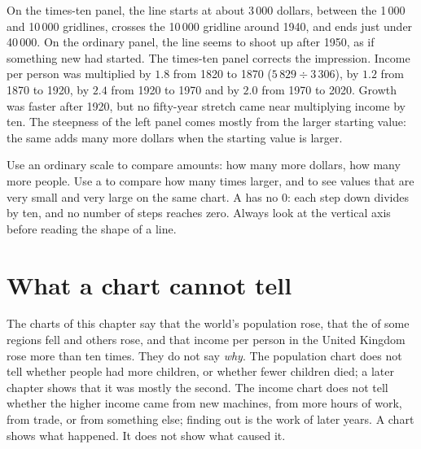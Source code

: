 \begin{example}\label{ex:g6:reading-economic-charts:uk-scales}
On the times-ten panel, the line starts at about 3\,000 dollars, between the
1\,000 and 10\,000 gridlines, crosses the 10\,000 gridline around 1940, and
ends just under 40\,000. On the ordinary panel, the line seems to shoot up
after 1950, as if something new had started. The times-ten panel corrects the
impression. Income per person was multiplied by $1.8$ from 1820 to 1870
($5\,829 \div 3\,306$), by $1.2$ from 1870 to 1920, by $2.4$ from 1920 to 1970
and by $2.0$ from 1970 to 2020. Growth was faster after 1920, but no
fifty-year stretch came near multiplying income by ten. The steepness of the
left panel comes mostly from the larger starting value: the same  adds many more dollars when the starting value is larger.
\end{example}

\begin{remark}\label{rem:g6:reading-economic-charts:which}
Use an ordinary scale to compare amounts: how many more dollars, how many more
people. Use a  to compare how many times larger, and to see
values that are very small and very large on the same chart. A 
has no 0: each step down divides by ten, and no number of steps reaches zero.
Always look at the vertical axis before reading the shape of a line.
\end{remark}

\section{What a chart cannot tell}

The charts of this chapter say that the world's population rose, that the
 of some regions fell and others rose, and that income per person in the
United Kingdom rose more than ten times. They do not say \emph{why}. The
population chart does not tell whether people had more children, or whether
fewer children died; a later chapter shows that it was mostly the second. The
income chart does not tell whether the higher income came from new machines,
from more hours of work, from trade, or from something else; finding out is
the work of later years. A chart shows what happened. It does not show what
caused it.

